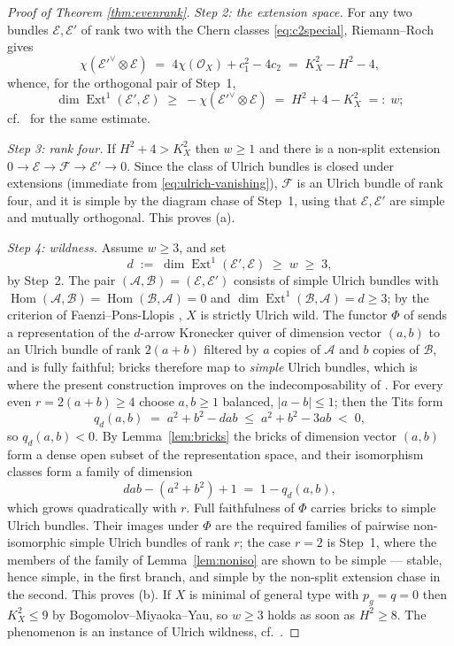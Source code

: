 \documentclass[10pt,a4paper]{amsart}
\newcommand{\OO}{\mathcal{O}}
\newcommand{\EE}{\mathcal{E}}
\newcommand{\FF}{\mathcal{F}}
\newcommand{\Ext}{\operatorname{Ext}}
\newcommand{\Hom}{\operatorname{Hom}}
\begin{document}
\begin{proof}[Proof of Theorem \textup{\ref{thm:evenrank}}]
\smallskip
\noindent \emph{Step 2: the extension space.} For any two bundles $\EE,\EE'$ of rank two with the Chern classes \eqref{eq:c2special}, Riemann--Roch gives
\[
\chi(\EE'^\vee\otimes\EE)\;=\;4\chi(\OO_X)+c_1^2-4c_2\;=\;K_X^2-H^2-4 ,
\]
whence, for the orthogonal pair of Step~1,
\[
\dim\Ext^1(\EE',\EE)\;\ge\;-\chi(\EE'^\vee\otimes\EE)\;=\;H^2+4-K_X^2\;=:\;w ;
\]
cf.\ \cite[Lem.~5.2]{Cas17} for the same estimate.

\smallskip
\noindent \emph{Step 3: rank four.} If $H^2+4>K_X^2$ then $w\ge1$ and there is a non-split extension $0\to\EE\to\FF\to\EE'\to0$. Since the class of Ulrich bundles is closed under extensions (immediate from \eqref{eq:ulrich-vanishing}), $\FF$ is an Ulrich bundle of rank four, and it is simple by the diagram chase of Step~1, using that $\EE,\EE'$ are simple and mutually orthogonal. This proves (a).

\smallskip
\noindent \emph{Step 4: wildness.} Assume $w\ge3$, and set
\[
d\;:=\;\dim\Ext^1(\EE',\EE)\;\ge\;w\;\ge\;3 ,
\]
by Step~2. The pair $(\mathcal{A},\mathcal{B})=(\EE,\EE')$ consists of simple Ulrich bundles with $\Hom(\mathcal{A},\mathcal{B})=\Hom(\mathcal{B},\mathcal{A})=0$ and $\dim\Ext^1(\mathcal{B},\mathcal{A})=d\ge3$; by the criterion of Faenzi--Pons-Llopis \cite[Thm.~A and Cor.~2.1]{FPL}, $X$ is strictly Ulrich wild. The functor $\Phi$ of \cite[\S2]{FPL} sends a representation of the $d$-arrow Kronecker quiver of dimension vector $(a,b)$ to an Ulrich bundle of rank $2(a+b)$ filtered by $a$ copies of $\mathcal{A}$ and $b$ copies of $\mathcal{B}$, and is fully faithful; bricks therefore map to \emph{simple} Ulrich bundles, which is where the present construction improves on the indecomposability of \cite[Thm.~1.3]{Cas17}. For every even $r=2(a+b)\ge4$ choose $a,b\ge1$ balanced, $|a-b|\le1$; then the Tits form
\[
q_d(a,b)\;=\;a^2+b^2-dab\;\le\;a^2+b^2-3ab\;<\;0 ,
\]
so $q_d(a,b)<0$. By Lemma~\ref{lem:bricks} the bricks of dimension vector $(a,b)$ form a dense open subset of the representation space, and their isomorphism classes form a family of dimension
\[
dab-(a^2+b^2)+1\;=\;1-q_d(a,b) ,
\]
which grows quadratically with $r$. Full faithfulness of $\Phi$ \cite[Thm.~A]{FPL} carries bricks to simple Ulrich bundles. Their images under $\Phi$ are the required families of pairwise non-isomorphic simple Ulrich bundles of rank $r$; the case $r=2$ is Step~1, where the members of the family of Lemma~\ref{lem:noniso} are shown to be simple --- stable, hence simple, in the first branch, and simple by the non-split extension chase in the second. This proves (b). If $X$ is minimal of general type with $p_g=q=0$ then $K_X^2\le9$ by Bogomolov--Miyaoka--Yau, so $w\ge3$ holds as soon as $H^2\ge8$. The phenomenon is an instance of Ulrich wildness, cf.\ \cite{FPL,CasWild}.
\end{proof}
\end{document}
